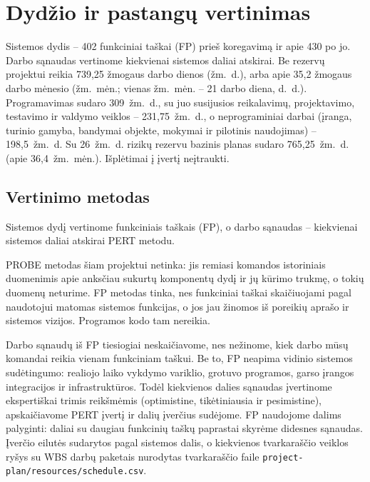 
\section{Dydžio ir pastangų vertinimas}\label{sec:dydis}

Sistemos dydis – 402 funkciniai taškai (FP) prieš koregavimą ir apie 430 po
jo. Darbo sąnaudas vertinome kiekvienai sistemos daliai atskirai. Be rezervų
projektui reikia 739,25 žmogaus darbo dienos (žm.~d.), arba apie 35,2
žmogaus darbo mėnesio (žm.~mėn.; vienas žm.~mėn. – 21 darbo diena, d.~d.).
Programavimas sudaro 309~žm.~d., su juo susijusios reikalavimų,
projektavimo, testavimo ir valdymo veiklos – 231,75~žm.~d., o neprograminiai
darbai (įranga, turinio gamyba, bandymai objekte, mokymai ir pilotinis
naudojimas) – 198,5~žm.~d. Su 26~žm.~d. rizikų rezervu bazinis planas sudaro
765,25~žm.~d. (apie 36,4~žm.~mėn.). Išplėtimai į įvertį neįtraukti.

\subsection{Vertinimo metodas}

Sistemos dydį vertinome funkciniais taškais (FP), o darbo sąnaudas –
kiekvienai sistemos daliai atskirai PERT metodu.

PROBE metodas šiam projektui netinka: jis remiasi komandos istoriniais
duomenimis apie anksčiau sukurtų komponentų dydį ir jų kūrimo trukmę, o tokių
duomenų neturime. FP metodas tinka, nes funkciniai taškai skaičiuojami pagal
naudotojui matomas sistemos funkcijas, o jos jau žinomos iš poreikių aprašo ir
sistemos vizijos. Programos kodo tam nereikia.

Darbo sąnaudų iš FP tiesiogiai neskaičiavome, nes nežinome, kiek darbo mūsų
komandai reikia vienam funkciniam taškui. Be to, FP neapima vidinio sistemos
sudėtingumo: realiojo laiko vykdymo variklio, grotuvo programos, garso įrangos
integracijos ir infrastruktūros. Todėl kiekvienos dalies sąnaudas įvertinome
ekspertiškai trimis reikšmėmis (optimistine, tikėtiniausia ir pesimistine),
apskaičiavome PERT įvertį ir dalių įverčius sudėjome. FP naudojome dalims
palyginti: daliai su daugiau funkcinių taškų paprastai skyrėme didesnes sąnaudas. Įverčio eilutės
sudarytos pagal sistemos dalis, o kiekvienos tvarkaraščio veiklos ryšys su
WBS darbų paketais nurodytas tvarkaraščio faile
\texttt{project-plan/\allowbreak resources/\allowbreak schedule.csv}.


